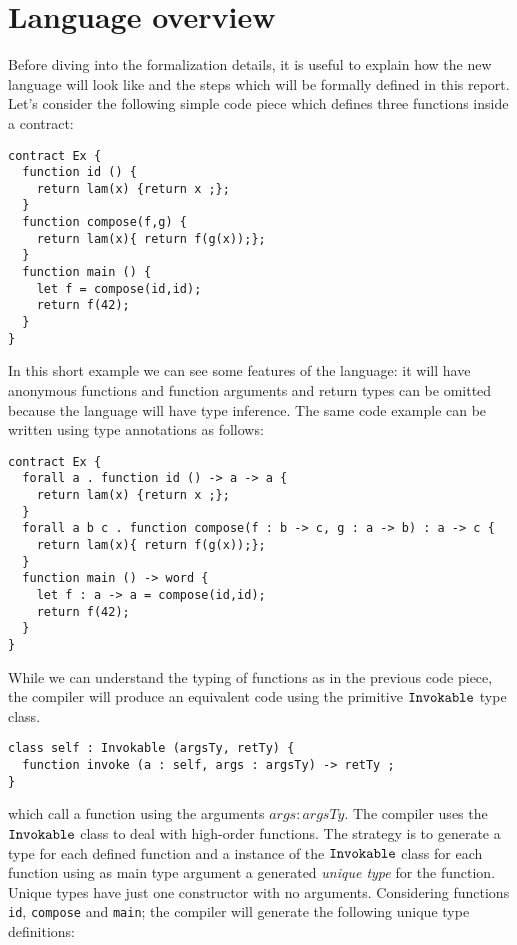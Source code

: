 \documentclass[a4paper, 11pt]{article}
\theoremstyle{definition}
\begin{document}
\section{Language overview} 

Before diving into the formalization details, it 
is useful to explain how the new language will look like 
and the steps which will be formally defined in this 
report. Let's consider the following simple code 
piece which defines three functions inside a contract:

\begin{lstlisting}[language=solidity]
contract Ex {
  function id () {
    return lam(x) {return x ;};
  }
  function compose(f,g) {
    return lam(x){ return f(g(x));};
  }
  function main () {
    let f = compose(id,id);
    return f(42);
  }
}
\end{lstlisting}

In this short example we can see some features of the \solidity 
language: it will have anonymous functions and 
function arguments and return types can be omitted because 
the language will have type inference. The same code 
example can be written using type annotations as follows:

\begin{lstlisting}[language=solidity]
contract Ex {
  forall a . function id () -> a -> a {
    return lam(x) {return x ;};
  }
  forall a b c . function compose(f : b -> c, g : a -> b) : a -> c {
    return lam(x){ return f(g(x));};
  }
  function main () -> word {
    let f : a -> a = compose(id,id);
    return f(42);
  }
}
\end{lstlisting}

While we can understand the typing of functions as in the previous
code piece, the \solidity{} compiler will produce an equivalent 
code using the primitive $\mathtt{Invokable}$ type class. 

\begin{lstlisting}[language=solidity]
class self : Invokable (argsTy, retTy) {
  function invoke (a : self, args : argsTy) -> retTy ;
}
\end{lstlisting}
which call a function using the arguments $args : argsTy$. The compiler 
uses the $\mathtt{Invokable}$ class to deal with high-order functions. The 
strategy is to generate a type for each defined function and a 
instance of the $\mathtt{Invokable}$ class for each function using as main 
type argument a generated \emph{unique type} for the function. 
Unique types have just one constructor with no arguments. Considering 
functions \texttt{id}, \texttt{compose} and \texttt{main}; the compiler 
will generate the following unique type definitions:
\end{document}
